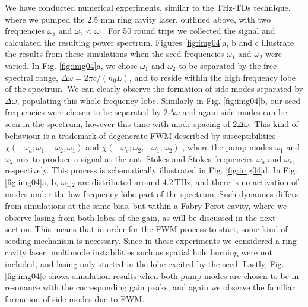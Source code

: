 \documentclass[10pt,letterpaper]{article}%
\begin{document}
We have conducted numerical experiments, similar to the THz-TDs technique,
where we pumped the 2.5 mm ring cavity laser, outlined above, with two frequencies
$\omega_{1}$ and $\omega_{2}<\omega_{1}$. For 50 round trips we collected the
signal and calculated the resulting power spectrum. Figures \ref{fig:img04}a, b
and c illustrate the results from these simulations when the seed frequencies
$\omega_{1}$ and $\omega_{2}$ were varied. In Fig. \ref{fig:img04}a, we chose
$\omega_{1}$ and $\omega_{2}$ to be separated by the free spectral range,
$\Delta\omega=2\pi c/\left(  n_{0}L\right)  $, and to reside within the high
frequency lobe of the spectrum. We can clearly observe the formation of
side-modes separated by $\Delta\omega$, populating this whole frequency lobe.
Similarly in Fig. \ref{fig:img04}b, our seed frequencies were chosen to be
separated by $2\Delta\omega$ and again side-modes can be seen in the spectrum,
however this time with mode spacing of $2\Delta\omega$. This kind of behaviour
is a trademark of degenerate FWM described by susceptibilities $\chi
(-\omega_{a};\omega_{1},-\omega_{2},\omega_{1})$ and $\chi(-\omega_{s}%
;\omega_{2},-\omega_{1},\omega_{2})$ \cite{butcher1991elements}, where the
pump modes $\omega_{1}$ and $\omega_{2}$ mix to produce a signal at the
anti-Stokes and Stokes frequencies $\omega_{a}$ and $\omega_{s}$,
respectively. This process is schematically illustrated in Fig.
\ref{fig:img04}d. In Fig. \ref{fig:img04}a, b, $\omega_{1,2}$ are distributed
around $4.2{\,}\mathrm{THz}$, and there is no activation of modes under the
low-frequency lobe part of the spectrum. Such dynamics differs from simulations 
at the same bias, but within a Fabry-Perot cavity, where we observe lasing 
from both lobes of the gain, as will be discussed in the next section. 
This means that in order for the FWM process to start, some kind of
seeding mechanism is necessary. Since in these experiments we considered a
ring-cavity laser, multimode instabilities such as spatial hole burning
\cite{gordon2008multimode} were not included, and lasing only started in the
lobe excited by the seed.\textrm{ }Lastly, Fig. \ref{fig:img04}c shows
simulation results when both pump modes are chosen to be in resonance with the
corresponding gain peaks, and again we observe the familiar formation of side
modes due to FWM.
\end{document}
